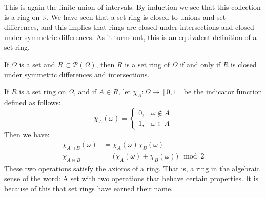                 This is again the finite union of intervals. By
                induction we see that this collection is a ring on
                $\mathbb{R}$. We have seen that a set ring is
                closed to unions and set differences, and this
                implies that rings are closed under intersections and
                closed under symmetric differences. As it turns out,
                this is an equivalent definition of a set ring.
                \begin{theorem}
                    If $\Omega$ is a set and
                    $R\subset\mathcal{P}(\Omega)$, then $R$ is
                    a set ring of $\Omega$ if and only if $R$ is
                    closed under symmetric differences and
                    intersections.
                \end{theorem}
                If $R$ is a set ring on $\Omega$, and if
                $A\in{R}$, let $\chi_{A}:\Omega\rightarrow[0,1]$ be
                the indicator function defined as follows:
                \begin{equation}
                    \chi_{A}(\omega)=
                    \begin{cases}
                        0,&\omega\notin{A}\\
                        1,&\omega\in{A}
                    \end{cases}
                \end{equation}
                Then we have:
                \begin{align}
                    \chi_{A\cap{B}}(\omega)
                    &=\chi_{A}(\omega)\chi_{B}(\omega)\\
                    \chi_{A\ominus{B}}&=
                    \big(\chi_{A}(\omega)+\chi_{B}(\omega)\big)
                    \mod{2}
                \end{align}
                These two operations satisfy the axioms of a ring.
                That is, a ring in the algebraic sense of the word:
                A set with two operations that behave certain
                properties. It is because of this that set rings
                have earned their name.
